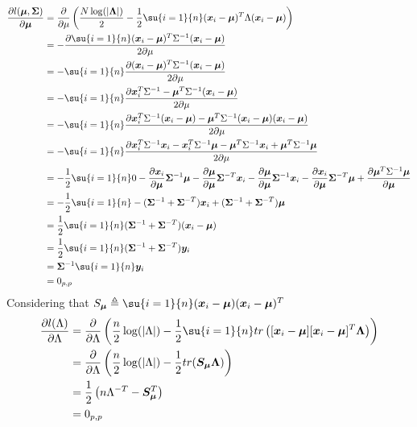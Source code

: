 \begin{align*}
    \dfrac{\partial l(\bm{\mu}, \bm{\Sigma})}{\partial\bm{\mu}} 
    &= \dfrac{\partial}{\partial\mu}\left(\dfrac{N\log(|\bm{\Lambda}|)}{2} - \dfrac{1}{2}
    \su{i=1}{n}(\bm{x}_{i} - \bm{\mu})^{T}\Lambda(\bm{x}_{i} - \bm{\mu})\right) \\
    &= -\dfrac{\partial \su{i=1}{n}(\bm{x}_{i} - \bm{\mu})^{T}\Sigma^{-1}(\bm{x}_{i}-
    \bm{\mu})}{2\partial\mu}\\
    &= -\su{i=1}{n}\dfrac{\partial (\bm{x}_{i} - \bm{\mu})^{T}\Sigma^{-1}(\bm{x}_{i}-
    \bm{\mu})}{2\partial\mu}\\
    &= -\su{i=1}{n}\dfrac{\partial \bm{x}_{i}^{T}\Sigma^{-1} - \bm{\mu}^{T}\Sigma^{-1}
        (\bm{x}_{i}- \bm{\mu})}{2\partial\mu}\\
    &= -\su{i=1}{n}\dfrac{\partial \bm{x}_{i}^{T}\Sigma^{-1}(\bm{x}_{i}- \bm{\mu}) - 
        \bm{\mu}^{T}\Sigma^{-1}(\bm{x}_{i}- \bm{\mu})
        (\bm{x}_{i}- \bm{\mu})}{2\partial\mu}\\
    &= -\su{i=1}{n}\dfrac{\partial \bm{x}_{i}^{T}\Sigma^{-1}\bm{x}_{i}- 
        \bm{x}_{i}^{T}\Sigma^{-1}\bm{\mu} - 
        \bm{\mu}^{T}\Sigma^{-1}\bm{x}_{i} + \bm{\mu}^{T}\Sigma^{-1}\bm{\mu}}
        {2\partial\mu}\\
    &= -\dfrac{1}{2}\su{i=1}{n} 0 - \dfrac{\partial \bm{x}_{i}}{\partial\bm{\mu}}
    \bm{\Sigma}^{-1}
    \bm{\mu} - \dfrac{\partial \bm{\mu}}{\partial\bm{\mu}}\bm{\Sigma}^{-T} \bm{x}_{i}
    - \dfrac{\partial \bm{\mu}}{\partial\bm{\mu}}\bm{\Sigma}^{-1}
    \bm{x}_{i} - \dfrac{\partial \bm{x}_{i}}{\partial\bm{\mu}}\bm{\Sigma}^{-T} \bm{\mu}
    + \dfrac{\partial \bm{\mu}^{T}\Sigma^{-1}\bm{\mu}}{\partial \bm{\mu}}\\
    &= -\dfrac{1}{2}\su{i=1}{n} - (\bm{\Sigma}^{-1}+\bm{\Sigma}^{-T})\bm{x}_{i} 
    + (\bm{\Sigma}^{-1}+\bm{\Sigma}^{-T})\bm{\mu}\\
    &= \dfrac{1}{2}\su{i=1}{n}(\bm{\Sigma}^{-1}+\bm{\Sigma}^{-T})(\bm{x}_{i}-\bm{\mu})\\
    &= \dfrac{1}{2}\su{i=1}{n}(\bm{\Sigma}^{-1}+\bm{\Sigma}^{-T})\bm{y}_{i}\\
    &= \bm{\Sigma}^{-1}\su{i=1}{n}\bm{y}_{i}\\
    &= 0_{p,p}
\end{align*}
Considering that $S_{\bm{\mu}} \triangleq \su{i=1}{n}(\bm{x}_{i} - \bm{\mu})
(\bm{x}_{i} - \bm{\mu})^{T}$
\begin{align*}
    \dfrac{\partial l(\Lambda)}{\partial\Lambda} 
    &= \dfrac{\partial}{\partial\Lambda}\left( \dfrac{n}{2}\log(|\Lambda|) -
        \dfrac{1}{2}\su{i=1}{n}tr\left([\bm{x}_{i}-\bm{\mu}]
    [\bm{x}_{i}-\bm{\mu}]^{T}\bm{\Lambda}\right)\right)\\
    &= \dfrac{\partial}{\partial\Lambda}\left(\dfrac{n}{2}\log(|\Lambda|) -
        \dfrac{1}{2}tr(\bm{S}_{\bm{\mu}}\bm{\Lambda})\right)\\
    &= \dfrac{1}{2}\left(n\Lambda^{-T} - \bm{S}_{\bm{\mu}}^{T}\right)\\
    &= 0_{p,p}
\end{align*}

